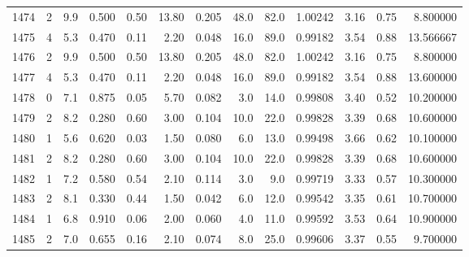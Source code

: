 \begin{tabular}{lrrrrrrrrrrrr}
1474 &        2 &            9.9 &             0.500 &         0.50 &           13.80 &      0.205 &                 48.0 &                  82.0 &  1.00242 &  3.16 &       0.75 &   8.800000 \\
1475 &        4 &            5.3 &             0.470 &         0.11 &            2.20 &      0.048 &                 16.0 &                  89.0 &  0.99182 &  3.54 &       0.88 &  13.566667 \\
1476 &        2 &            9.9 &             0.500 &         0.50 &           13.80 &      0.205 &                 48.0 &                  82.0 &  1.00242 &  3.16 &       0.75 &   8.800000 \\
1477 &        4 &            5.3 &             0.470 &         0.11 &            2.20 &      0.048 &                 16.0 &                  89.0 &  0.99182 &  3.54 &       0.88 &  13.600000 \\
1478 &        0 &            7.1 &             0.875 &         0.05 &            5.70 &      0.082 &                  3.0 &                  14.0 &  0.99808 &  3.40 &       0.52 &  10.200000 \\
1479 &        2 &            8.2 &             0.280 &         0.60 &            3.00 &      0.104 &                 10.0 &                  22.0 &  0.99828 &  3.39 &       0.68 &  10.600000 \\
1480 &        1 &            5.6 &             0.620 &         0.03 &            1.50 &      0.080 &                  6.0 &                  13.0 &  0.99498 &  3.66 &       0.62 &  10.100000 \\
1481 &        2 &            8.2 &             0.280 &         0.60 &            3.00 &      0.104 &                 10.0 &                  22.0 &  0.99828 &  3.39 &       0.68 &  10.600000 \\
1482 &        1 &            7.2 &             0.580 &         0.54 &            2.10 &      0.114 &                  3.0 &                   9.0 &  0.99719 &  3.33 &       0.57 &  10.300000 \\
1483 &        2 &            8.1 &             0.330 &         0.44 &            1.50 &      0.042 &                  6.0 &                  12.0 &  0.99542 &  3.35 &       0.61 &  10.700000 \\
1484 &        1 &            6.8 &             0.910 &         0.06 &            2.00 &      0.060 &                  4.0 &                  11.0 &  0.99592 &  3.53 &       0.64 &  10.900000 \\
1485 &        2 &            7.0 &             0.655 &         0.16 &            2.10 &      0.074 &                  8.0 &                  25.0 &  0.99606 &  3.37 &       0.55 &   9.700000 \\

\end{tabular}
